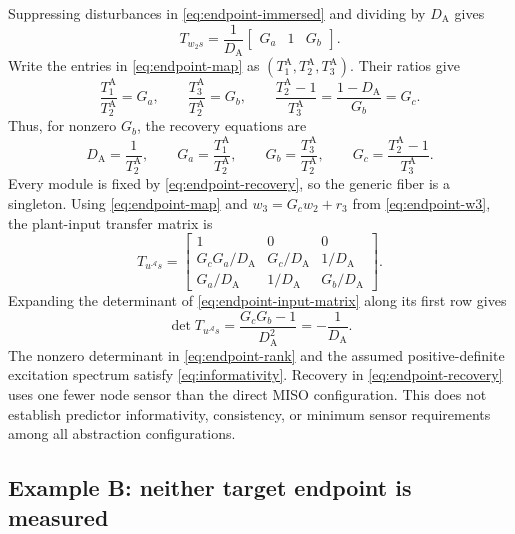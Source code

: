 \documentclass[11pt,a4paper]{article}
\newcommand{\Aset}{\mathcal A}
\begin{document}
Suppressing disturbances in \eqref{eq:endpoint-immersed} and dividing by $D_{\mathrm A}$ gives
\begin{equation}
  T_{w_2s}
  =\frac{1}{D_{\mathrm A}}\begin{bmatrix}G_a&1&G_b\end{bmatrix}.
  \label{eq:endpoint-map}
\end{equation}
Write the entries in \eqref{eq:endpoint-map} as $(T^{\mathrm A}_1,T^{\mathrm A}_2,T^{\mathrm A}_3)$.  Their ratios give
\[
  \frac{T^{\mathrm A}_1}{T^{\mathrm A}_2}=G_a,
  \qquad
  \frac{T^{\mathrm A}_3}{T^{\mathrm A}_2}=G_b,
  \qquad
  \frac{T^{\mathrm A}_2-1}{T^{\mathrm A}_3}
  =\frac{1-D_{\mathrm A}}{G_b}=G_c.
\]
Thus, for nonzero $G_b$, the recovery equations are
\begin{equation}
  D_{\mathrm A}=\frac{1}{T^{\mathrm A}_2},
  \qquad
  G_a=\frac{T^{\mathrm A}_1}{T^{\mathrm A}_2},
  \qquad
  G_b=\frac{T^{\mathrm A}_3}{T^{\mathrm A}_2},
  \qquad
  G_c=\frac{T^{\mathrm A}_2-1}{T^{\mathrm A}_3}.
  \label{eq:endpoint-recovery}
\end{equation}
Every module is fixed by \eqref{eq:endpoint-recovery}, so the generic fiber is a singleton.  Using \eqref{eq:endpoint-map} and $w_3=G_cw_2+r_3$ from \eqref{eq:endpoint-w3}, the plant-input transfer matrix is
\begin{equation}
  T_{u^{\Aset}s}=\begin{bmatrix}
    1&0&0\\
    G_cG_a/D_{\mathrm A}&G_c/D_{\mathrm A}&1/D_{\mathrm A}\\
    G_a/D_{\mathrm A}&1/D_{\mathrm A}&G_b/D_{\mathrm A}
  \end{bmatrix}.
  \label{eq:endpoint-input-matrix}
\end{equation}
Expanding the determinant of \eqref{eq:endpoint-input-matrix} along its first row gives
\begin{equation}
  \det T_{u^{\Aset}s}
  =\frac{G_cG_b-1}{D_{\mathrm A}^2}=-\frac{1}{D_{\mathrm A}}.
  \label{eq:endpoint-rank}
\end{equation}
The nonzero determinant in \eqref{eq:endpoint-rank} and the assumed positive-definite excitation spectrum satisfy \eqref{eq:informativity}.  Recovery in \eqref{eq:endpoint-recovery} uses one fewer node sensor than the direct MISO configuration.  This does not establish predictor informativity, consistency, or minimum sensor requirements among all abstraction configurations.

\subsection{Example B: neither target endpoint is measured}
\end{document}

